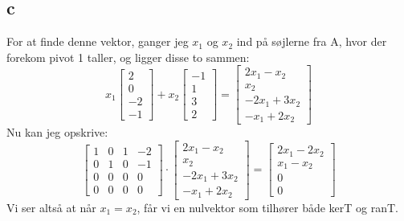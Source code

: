 \documentclass{article}
\begin{document}
\subsection*{c}
For at finde denne vektor, ganger jeg $x_1$ og $x_2$ ind på søjlerne fra A, hvor der forekom pivot 1 taller, og ligger disse to sammen:
$$
x_1\left[\begin{array}{c}
2 \\
0 \\
-2 \\
-1
\end{array}\right]+x_2\left[\begin{array}{c}
-1 \\
1 \\
3 \\
2
\end{array}\right]=\left[\begin{array}{c}
2 x_1-x_2 \\
x_2 \\
-2 x_1+3 x_2 \\
-x_1+2 x_2
\end{array}\right]
$$
Nu kan jeg opskrive:
$$
\left[\begin{array}{cccc}
1 & 0 & 1 & -2 \\
0 & 1 & 0 & -1 \\
0 & 0 & 0 & 0 \\
0 & 0 & 0 & 0
\end{array}\right] \cdot\left[\begin{array}{c}
2 x_1-x_2 \\
x_2 \\
-2 x_1+3 x_2 \\
-x_1+2 x_2
\end{array}\right]=\left[\begin{array}{c}
2 x_1-2 x_2 \\
x_1-x_2 \\
0 \\
0
\end{array}\right]
$$
Vi ser altså at når $x_1=x_2$, får vi en nulvektor som tilhører både kerT og ranT.
\end{document}
